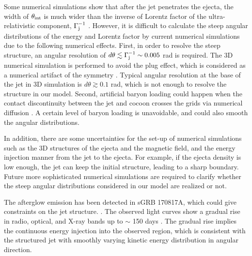 \documentclass{emulateapj}
\begin{document}
Some numerical simulations show that after the jet penetrates the ejecta,
the width of $\theta_{\rm int}$ is much wider than the inverse of Lorentz factor of the ultra-relativistic component,
$\Gamma_{\rm j}^{-1}$ \citep[e.g., ][]{2017arXiv171203237L}. 
However, it is difficult to calculate the steep angular distributions of the energy and Lorentz factor by current numerical simulations
due to the following numerical effects. 
First, in order to resolve the steep structure, an angular resolution of $d\theta\lesssim\Gamma_{\rm j}^{-1}\sim0.005$ rad is required. 
The 3D numerical simulation is performed to avoid the plug effect, 
which is considered as a numerical artifact of the symmetry
\citep{2018MNRAS.473..576G}. 
Typical angular resolution at the base of the jet in 3D simulation is $d\theta\gtrsim0.1$ rad,
which is not enough to resolve the structure in our model. 
Second, artificial baryon loading could happen when the contact discontinuity
between the jet and cocoon crosses the grids via numerical diffusion \citep{2013ApJ...777..162M}.
A certain level of baryon loading is unavoidable, and could also smooth the angular distributions. 

In addition, there are some uncertainties for the set-up of numerical simulations such as the 3D structures
of the ejecta and the magnetic field, and the energy injection manner from the jet to the ejecta.
For example, if the ejecta density is low enough, 
the jet can keep the initial structure, leading to a sharp boundary. 
Future more sophisticated numerical simulations are required to clarify
whether the steep angular distributions considered in our model are realized or not.

The afterglow emission has been detected in sGRB 170817A, which could give constraints on the jet structure. 
\citep{2017Natur.551...71T, 2017Sci...358.1565E, 2017Sci...358.1579H, 2017arXiv171008514F, 2017ApJ...848L..20M,
  2017ApJ...848L..21A, 2017ApJ...848L..25H, 2017ApJ...850L..21K}.
The observed light curves show a gradual rise in radio, optical, and X-ray bands up to $\sim$ 150 days
\citep{2018ApJ...859L..23P,2018ApJ...853L...4R,2018Natur.554..207M,2018arXiv180102669L,2018ApJ...856L..18M,2018arXiv180302768R,
  2018ApJ...858L..15D,2018arXiv180502870A,2018arXiv180504093N,2018MNRAS.478L..18T,2018A&A...613L...1D,2018arXiv180609693M,2018arXiv180800469G}. 
The gradual rise implies the continuous energy injection into the observed region,
which is consistent with the structured jet with smoothly varying kinetic energy distribution in angular direction. 
\end{document}
